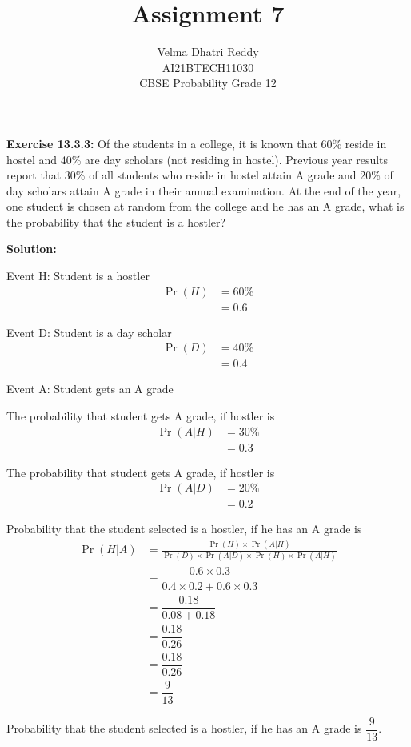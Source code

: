 \documentclass[journal,11pt,twocolumn]{IEEEtran}
\title{Assignment 7}
\author{Velma Dhatri Reddy \\ \normalsize AI21BTECH11030 \\ \vspace*{10pt} \Large CBSE Probability Grade 12}
\providecommand{\pr}[1]{\ensuremath{\Pr\left(#1\right)}}
\begin{document}
\maketitle
\textbf{Exercise 13.3.3:}
Of the students in a college, it is known that 60\% reside in hostel and 40\% are day scholars (not residing in hostel). Previous year results report that 30\% of all students who reside in hostel attain A grade and 20\% of day scholars attain A grade in their annual examination. At the end of the year, one student is chosen at random from the college and he has an A grade, what is the probability that the student is a hostler?

\textbf{Solution:} 

\begin{table}[ht!]
\centering
	
	\vspace*{5pt}
\caption{}
	\label{table:table-1}
\end{table}
Event H: Student is a hostler
\begin{align}
    \pr{H} &= 60\% \\
    &= 0.6
\end{align}

Event D: Student is a day scholar
\begin{align}
    \pr{D} &= 40\% \\
    &= 0.4
\end{align}

Event A: Student gets an A grade

The probability that student gets A grade, if hostler is 
\begin{align}
    \pr{A|H} &= 30\% \\
    &= 0.3
\end{align}

The probability that student gets A grade, if hostler is 
\begin{align}
    \pr{A|D} &= 20\% \\
    &= 0.2
\end{align}

Probability that the student selected is a hostler, if he has an A grade is 
\begin{align}
    \pr{H|A} &= \frac{\pr{H}\times\pr{A|H}}{\pr{D}\times\pr{A|D}\times \pr{H}\times\pr{A|H}} \\
    &= \dfrac{0.6 \times 0.3}{0.4 \times 0.2 + 0.6 \times 0.3}\\
    &= \dfrac{0.18}{0.08 + 0.18}\\
    &= \dfrac{0.18}{0.26}\\
    &= \dfrac{0.18}{0.26}\\
    &= \dfrac{9}{13}
\end{align}

Probability that the student selected is a hostler, if he has an A grade is $\dfrac{9}{13}$.
\end{document}
